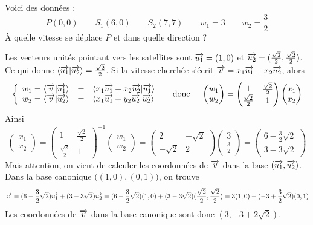 \documentclass[class=report,crop=false]{standalone}
\begin{document}
\begin{exemple}
Voici des données :
$$P(0,0) \qquad S_1 (6,0) \qquad S_2(7,7) \qquad w_1 = 3 \qquad w_2 = \frac32$$
\`A quelle vitesse se déplace $P$ et dans quelle direction ?


Les vecteurs unités pointant vers les satellites sont
$\overrightarrow{u_1} = (1,0)$ et $\overrightarrow{u_2}=(\frac{\sqrt2}{2},\frac{\sqrt2}{2})$.
Ce qui donne $\langle \overrightarrow{u_1} | \overrightarrow{u_2} \rangle = \frac{\sqrt2}{2}$.
Si la vitesse cherchée s'écrit $\overrightarrow v  = x_1 \overrightarrow{u_1} + x_2 \overrightarrow{u_2}$,
alors
$$
\left\{
\begin{array}{rcl}
w_1 = \langle \overrightarrow v | \overrightarrow{u_1} \rangle &=& \langle x_1 \overrightarrow{u_1} + x_2 \overrightarrow{u_2} | \overrightarrow{u_1} \rangle  \\
w_2 = \langle \overrightarrow v | \overrightarrow{u_2} \rangle &=& \langle x_1 \overrightarrow{u_1} + y_2 \overrightarrow{u_2} | \overrightarrow{u_2} \rangle  \\
\end{array}
\right.
\quad\text{ donc }\quad
\begin{pmatrix}w_1\\w_2\end{pmatrix}
= \begin{pmatrix}1&\frac{\sqrt2}{2}\\ 
\frac{\sqrt2}{2}&1\end{pmatrix}
\begin{pmatrix}x_1\\x_2\end{pmatrix}
$$
Ainsi 
$$\begin{pmatrix}x_1\\x_2\end{pmatrix}
= \begin{pmatrix}1&\frac{\sqrt2}{2}\\ 
\frac{\sqrt2}{2}&1\end{pmatrix}^{-1}
\begin{pmatrix}w_1\\w_2\end{pmatrix}
= \begin{pmatrix}2&-\sqrt2\\ 
-\sqrt2&2\end{pmatrix}
\begin{pmatrix}3\\\frac32\end{pmatrix}
= \begin{pmatrix}6-\frac32\sqrt2\\3-3\sqrt2\end{pmatrix}$$
Mais attention, on vient de calculer les coordonnées 
de $\overrightarrow v$ dans la base $(\overrightarrow{u_1},\overrightarrow{u_2})$.
Dans la base canonique $\big( (1,0), (0,1) \big)$, on trouve 
$$\overrightarrow v = (6-\frac32\sqrt2) \overrightarrow{u_1} + (3-3\sqrt2) \overrightarrow{u_2}
= (6-\frac32\sqrt2) (1,0)  + (3-3\sqrt2)(\frac{\sqrt2}{2},\frac{\sqrt2}{2})  
=  3(1,0) + (-3+\frac32\sqrt2)(0,1)$$
Les coordonnées de $\overrightarrow v$ dans la base canonique sont donc
$(3,-3+2\sqrt2)$.
\end{exemple}
\end{document}
